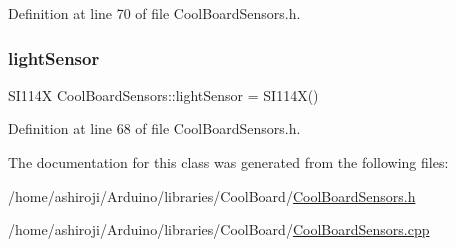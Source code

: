 Definition at line 70 of file Cool\+Board\+Sensors.\+h.

\mbox{\label{class_cool_board_sensors_a3e397300fb707dd193e909a757bf6102}} 
\subsubsection{\texorpdfstring{light\+Sensor}{lightSensor}}
{\footnotesize\ttfamily S\+I114X Cool\+Board\+Sensors\+::light\+Sensor = S\+I114X()}



Definition at line 68 of file Cool\+Board\+Sensors.\+h.



The documentation for this class was generated from the following files\+:\begin{DoxyCompactItemize}
\item 
/home/ashiroji/\+Arduino/libraries/\+Cool\+Board/\hyperlink{_cool_board_sensors_8h}{Cool\+Board\+Sensors.\+h}\item 
/home/ashiroji/\+Arduino/libraries/\+Cool\+Board/\hyperlink{_cool_board_sensors_8cpp}{Cool\+Board\+Sensors.\+cpp}\end{DoxyCompactItemize}
